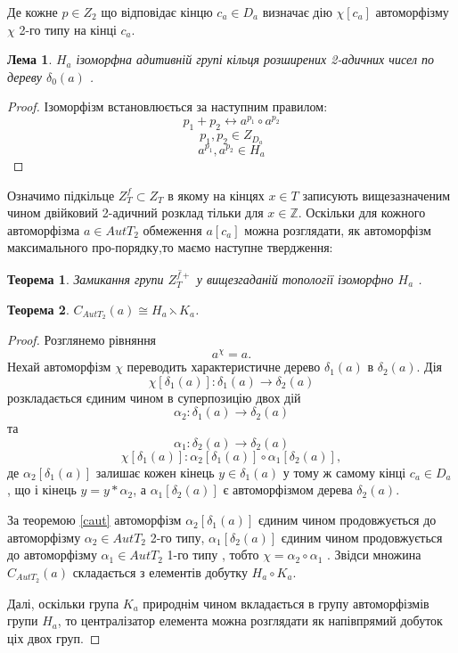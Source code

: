 \documentclass[a4paper,12pt]{article} \usepackage{a4wide}
\numberwithin{equation}{subsection}
\newtheorem{theorem}{Теорема}[subsection]
\newtheorem{lemma}{Лема}[subsection]
\begin{document}
Де кожне  $p\in Z_2$ що відповідає кінцю  $c_a \in D_a$ визначає дію $\chi[c_a]$
 автоморфізму $\chi$ 2-го типу на кінці $c_a$.
\begin{lemma}   $H_a$ ізоморфна адитивній групі кільця розширених 2-адичних чисел по дереву $\delta _0(a)$ .
 \end{lemma}
\begin{proof}
Ізоморфізм встановлюється за наступним правилом:
$$ p_1+p_2\leftrightarrow a^{p_1}\circ a^{p_2}$$ $$ p_1,p_2\in Z_{D_a}$$ $$ a^{p_1},a^{p_2}\in H_a$$

\end{proof}
 Означимо підкільце  $Z^f_T\subset Z_T$ в якому на кінцях  $x\in T$ записують вищезазначеним чином двійковий 2-адичний розклад тільки для
 $x\in \mathbb{Z}$.
Оскільки для кожного автоморфізма  $a\in AutT_2$ обмеження  $a[c_a]$
можна розглядати, як автоморфізм максимального про-порядку,то маємо наступне твердження:

\begin{theorem}
Замикання групи  $\overline{Z^{f+}_T}$ у вищезгаданій топології ізоморфно $H_a$ .
    \end{theorem}
\begin{theorem}
 $C_{AutT_2}(a)\cong H_a\leftthreetimes K_a$.
    \end{theorem}
\begin{proof}
Розглянемо рівняння  $$a^\chi=a.$$ Нехай автоморфізм  $\chi$ переводить характеристичне дерево $\delta_1(a)$  в  $\delta_2(a)$.
 Дія  $$\chi[\delta_1(a)]:\delta_1(a)\rightarrow \delta_2(a)$$  розкладається єдиним чином в суперпозицію двох дій $$\alpha_2:\delta_1(a)\rightarrow \delta_2(a)$$   та  $$\alpha_1:\delta_2(a)\rightarrow \delta_2(a)$$  $$\chi[\delta_1(a)]:\alpha_2[\delta_1(a)]\circ \alpha_1[ \delta_2(a)],$$  де  $\alpha_2[\delta_1(a)]$ залишає кожен кінець $y\in \delta_1(a)$ у тому ж самому кінці $c_a\in D_a$ , що і кінець  $y=y\ast \alpha_2$, а  $ \alpha_1[ \delta_2(a)]$ є автоморфізмом  дерева $\delta_2(a)$.

 За теоремою \eqref{caut}  автоморфізм $ \alpha_2[ \delta_1(a)]$ єдиним чином продовжується до автоморфізму   $\alpha_2\in AutT_2$  2-го типу,   $ \alpha_1[ \delta_2(a)]$ єдиним чином продовжується до автоморфізму   $\alpha_1\in AutT_2$ 1-го типу , тобто $\chi=\alpha_2\circ \alpha_1$ . Звідси  множина $C_{AutT_2}(a)$ складається з елементів добутку $H_a\circ K_a$.

 Далі, оскільки група $K_a$ природнім чином вкладається в групу автоморфізмів групи $H_a$, то централізатор елемента   можна розглядати як напівпрямий добуток ціх двох груп.


\end{proof}
\end{document}
